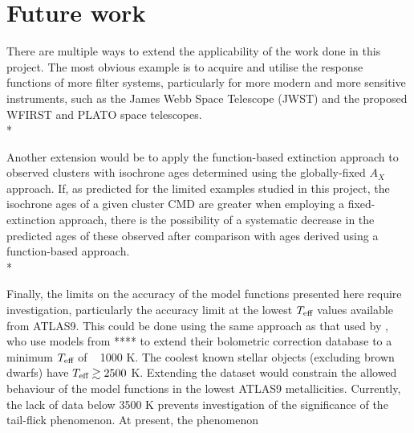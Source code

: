 \documentclass[12pt, a4paper]{report}
\begin{document}
\section{Future work}
There are multiple ways to extend the applicability of the work done in this project. The most obvious example is to acquire and utilise the response functions of more filter systems, particularly for more modern and more sensitive instruments, such as the James Webb Space Telescope (JWST) and the proposed WFIRST and PLATO space telescopes.\\*

Another extension would be to apply the function-based extinction approach to observed clusters with isochrone ages determined using the globally-fixed $A_{X}$ approach. If, as predicted for the limited examples studied in this project, the isochrone ages of a given cluster CMD are greater when employing a fixed-extinction approach, there is the possibility of a systematic decrease in the predicted ages of these observed after comparison with ages derived using a function-based approach.\\*

Finally, the limits on the accuracy of the model functions presented here require investigation, particularly the accuracy limit at the lowest $T_{\textnormal{eff}}$ values available from ATLAS9. This could be done using the same approach as that used by \cite{2008PASP..120..583G}, who use models from **** to extend their bolometric correction database to a minimum $T_{\textnormal{eff}}$ of ~ 1000 K. The coolest known stellar objects (excluding brown dwarfs) have $T_{\textnormal{eff}} \gtrsim 2500$ K. Extending the dataset would constrain the allowed behaviour of the model functions in the lowest ATLAS9 metallicities. Currently, the lack of data below 3500 K prevents investigation of the significance of the tail-flick phenomenon. At present, the phenomenon 

%

\end{document}
